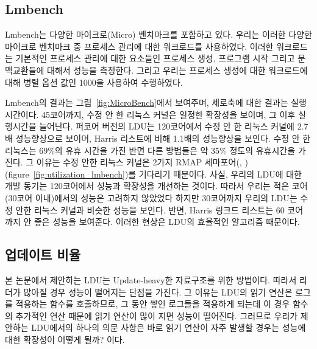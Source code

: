 \subsection{Lmbench}
Lmbench는 다양한 마이크로(Micro) 벤치마크를 포함하고 있다. 
우리는 이러한 다양한 마이크로 벤치마크 중 프로세스 관리에 대한 워크로드를 사용하였다. 
이러한 워크로드는 기본적인 프로세스 관리에 대한 요소들인 프로세스 생성, 
프로그램 시작 그리고 문맥교환들에 대해서 성능을 측정한다.
그리고 우리는 프로세스 생성에 대한 워크로드에 대해 병렬 옵션 값인 1000을 사용하여 수행하였다. 

Lmbench의 결과는 그림~\ref{fig:MicroBench}에서 보여주며, 세로축에 대한 결과는 실행 시간이다.
45코어까지, 수정 안 한 리눅스 커널은 일정한 확장성을 보이며, 그 이후 실행시간을 늘어난다.
퍼코어 버전의 LDU는 120코어에서 수정 안 한 리눅스 커널에 2.7배 성능향상으로 보이며, 
Harris 리스트에 비해 1.1배의 성능향상을 보인다.
수정 안 한 리눅스는 69\%의 유휴 시간을 가진 반면 다른 방법들은 약 35\% 정도의 유휴시간을 가진다.
그 이유는 수정 안한 리눅스 커널은 2가지 RMAP 세마포어(,
)(figure~\ref{fig:utilization_lmbench})를 기다리기 때문이다. 
사실, 우리의 LDU에 대한 개발 동기는 120코어에서 성능과 확장성을 개선하는 것이다. 
따라서 우리는 적은 코어(30코어 이내)에서의 성능은 고려하지 않았었다
하지만 30코어까지 우리의 LDU는 수정 안한 리눅스 커널과 비슷한 성능을 보인다. 
반면, Harris 링크드 리스트는 60 코어 까지 안 좋은 성능을 보여준다. 
이러한 현상은 LDU의 효율적인 알고리즘 때문이다.

\subsection{업데이트 비율}

본 논문에서 제안하는 LDU는 Update-heavy한 자료구조를 위한 방법이다. 
따라서 리더가 많아질 경우 성능이 떨어지는 단점을 가진다. 
그 이유는 LDU의 읽기 연산은 로그를 적용하는  함수를 호출하므로, 
그 동안 쌓인 로그들을 적용하게 되는데 이 경우  함수의 
추가적인 연산 때문에 읽기 연산이 많이 지면 성능이 떨어진다.
그러므로 우리가 제안하는 LDU에서의 하나의 의문 사항은 바로 읽기
연산이 자주 발생할 경우는 성능에 대한 확장성이 어떻게 될까? 이다.

